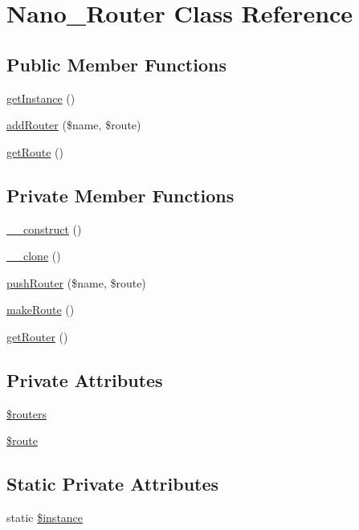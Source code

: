 \hypertarget{classNano__Router}{
\section{Nano\_\-Router Class Reference}
\label{classNano__Router}
}
\subsection*{Public Member Functions}
\begin{CompactItemize}
\item 
\hyperlink{classNano__Router_16491c16bf73c7105eacdcf511fec164}{getInstance} ()
\item 
\hyperlink{classNano__Router_06a5b5ac439afca0a7c670680893b0c6}{addRouter} (\$name, \$route)
\item 
\hyperlink{classNano__Router_15d331f41889a2c037af3afaad1d2e35}{getRoute} ()
\end{CompactItemize}
\subsection*{Private Member Functions}
\begin{CompactItemize}
\item 
\hyperlink{classNano__Router_0cf563cb5acb4441efe36071624791fb}{\_\-\_\-construct} ()
\item 
\hyperlink{classNano__Router_b01edde09c5bb3ac0fb1e01f780dfd24}{\_\-\_\-clone} ()
\item 
\hyperlink{classNano__Router_02f6f240771229cdf830c911d3c07390}{pushRouter} (\$name, \$route)
\item 
\hyperlink{classNano__Router_04c74f9043f2c18e5c64abdd4bd91ccd}{makeRoute} ()
\item 
\hyperlink{classNano__Router_bc924b7f8f035cf8364169c30f432445}{getRouter} ()
\end{CompactItemize}
\subsection*{Private Attributes}
\begin{CompactItemize}
\item 
\hyperlink{classNano__Router_0ab90a3362c48e85cb312721aa93fe92}{\$routers}
\item 
\hyperlink{classNano__Router_7fbe7706ca263930621c755b1a5327c0}{\$route}
\end{CompactItemize}
\subsection*{Static Private Attributes}
\begin{CompactItemize}
\item 
static \hyperlink{classNano__Router_788e9870173727a90258cf5d413e8088}{\$instance}
\end{CompactItemize}


